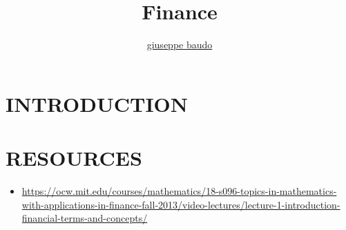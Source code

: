 \documentclass[a4paper,10pt]{article}
\title{Finance}
\author{\href{http://www.baudo.hol.es}{giuseppe baudo}}
\begin{document}
\maketitle

\section{INTRODUCTION}


\section{RESOURCES}
\begin{itemize}
 \item \url{https://ocw.mit.edu/courses/mathematics/18-s096-topics-in-mathematics-with-applications-in-finance-fall-2013/video-lectures/lecture-1-introduction-financial-terms-and-concepts/}
\end{itemize}
\end{document}
